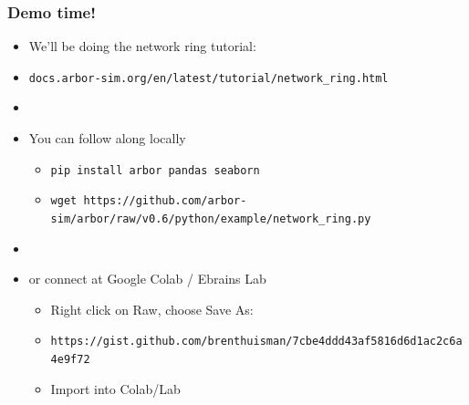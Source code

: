 \documentclass[t]{beamer}
\begin{document}
\begin{frame}
    \frametitle{Demo time!}
    \begin{itemize}
    \item We'll be doing the network ring tutorial:
    \item[] \texttt{docs.arbor-sim.org/en/latest/tutorial/network\_ring.html}
    \item[]
    \item You can follow along locally
        \begin{itemize}
        \item \texttt{pip install arbor pandas seaborn}
        \item \texttt{wget https://github.com/arbor-sim/arbor/raw/v0.6/python/example/network\_ring.py}
        \end{itemize}
    \item[]
    \item or connect at Google Colab / Ebrains Lab
        \begin{itemize}
        \item Right click on Raw, choose Save As:
        \item \texttt{https://gist.github.com/brenthuisman/7cbe4ddd43af5816d6d1ac2c6a4e9f72}
        \item Import into Colab/Lab
        \end{itemize}
    \end{itemize}
\end{frame}
\end{document}
